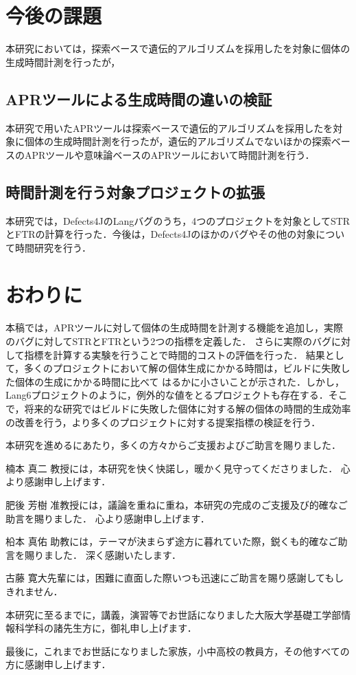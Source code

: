 \documentclass[uplatex,dvipdfmx,a4paper]{jsarticle}
\begin{document}
\section{今後の課題}\label{sec:ftrclg}
本研究においては，探索ベースで遺伝的アルゴリズムを採用した\kgp を対象に個体の生成時間計測を行ったが，
\subsection{APRツールによる生成時間の違いの検証}
本研究で用いたAPRツールは探索ベースで遺伝的アルゴリズムを採用した\kgp を対象に個体の生成時間計測を行ったが，遺伝的アルゴリズムでないほかの探索ベースのAPRツールや意味論ベースのAPRツールにおいて時間計測を行う．
\subsection{時間計測を行う対象プロジェクトの拡張}
本研究では，Defects4JのLangバグのうち，4つのプロジェクトを対象としてSTRとFTRの計算を行った．今後は，Defects4Jのほかのバグやその他の対象について時間研究を行う．
\clearpage
\section{おわりに}\label{sec:concl}
本稿では，APRツールに対して個体の生成時間を計測する機能を追加し，実際のバグに対してSTRとFTRという2つの指標を定義した．
さらに実際のバグに対して指標を計算する実験を行うことで時間的コストの評価を行った．
結果として，多くのプロジェクトにおいて解の個体生成にかかる時間は，ビルドに失敗した個体の生成にかかる時間に比べて	はるかに小さいことが示された．しかし，Lang6プロジェクトのように，例外的な値をとるプロジェクトも存在する．そこで，将来的な研究ではビルドに失敗した個体に対する解の個体の時間的生成効率の改善を行う，より多くのプロジェクトに対する提案指標の検証を行う．
\clearpage
\acknowledgement

本研究を進めるにあたり，多くの方々からご支援およびご助言を賜りました．

楠本 真二 教授には，本研究を快く快諾し，暖かく見守ってくださりました．
心より感謝申し上げます．

肥後 芳樹 准教授には，議論を重ねに重ね，本研究の完成のご支援及び的確なご助言を賜りました．
心より感謝申し上げます．

柗本 真佑 助教には，テーマが決まらず途方に暮れていた際，鋭くも的確なご助言を賜りました．
深く感謝いたします．

古藤 寛大先輩には，困難に直面した際いつも迅速にご助言を賜り感謝してもしきれません．

本研究に至るまでに，講義，演習等でお世話になりました大阪大学基礎工学部情報科学科の諸先生方に，御礼申し上げます．

最後に，これまでお世話になりました家族，小中高校の教員方，その他すべての方に感謝申し上げます．
\clearpage


\end{document}
